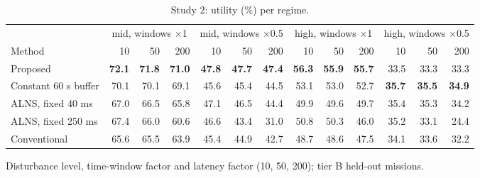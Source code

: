 \begin{table}[t]
\caption{Study 2: utility (\%) per regime.}\label{tab:s2regime}
\centering\footnotesize
\setlength{\tabcolsep}{2.2pt}
\begin{threeparttable}
\begin{tabular}{lrrrrrrrrrrrr}
\toprule
 & \multicolumn{3}{c}{mid, windows $\times$1} & \multicolumn{3}{c}{mid, windows $\times$0.5} & \multicolumn{3}{c}{high, windows $\times$1} & \multicolumn{3}{c}{high, windows $\times$0.5} \\
\cmidrule(lr){2-4}\cmidrule(lr){5-7}\cmidrule(lr){8-10}\cmidrule(lr){11-13}
Method & 10 & 50 & 200 & 10 & 50 & 200 & 10 & 50 & 200 & 10 & 50 & 200 \\
\midrule
Proposed & \textbf{72.1} & \textbf{71.8} & \textbf{71.0} & \textbf{47.8} & \textbf{47.7} & \textbf{47.4} & \textbf{56.3} & \textbf{55.9} & \textbf{55.7} & 33.5 & 33.3 & 33.3 \\
Constant 60 s buffer & 70.1 & 70.1 & 69.1 & 45.6 & 45.4 & 44.5 & 53.1 & 53.0 & 52.7 & \textbf{35.7} & \textbf{35.5} & \textbf{34.9} \\
ALNS, fixed 40 ms & 67.0 & 66.5 & 65.8 & 47.1 & 46.5 & 44.4 & 49.9 & 49.6 & 49.7 & 35.4 & 35.3 & 34.2 \\
ALNS, fixed 250 ms & 67.4 & 66.0 & 60.6 & 46.6 & 43.4 & 31.0 & 50.8 & 50.3 & 46.0 & 35.2 & 33.1 & 24.4 \\
Conventional & 65.6 & 65.5 & 63.9 & 45.4 & 44.9 & 42.7 & 48.7 & 48.6 & 47.5 & 34.1 & 33.6 & 32.2 \\
\bottomrule
\end{tabular}
\begin{tablenotes}[flushleft]\scriptsize
\item[] Disturbance level, time-window factor and latency factor (10, 50, 200); tier B held-out missions.
\end{tablenotes}
\end{threeparttable}
\end{table}
